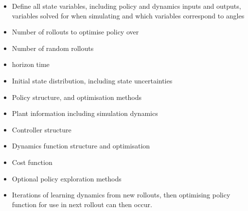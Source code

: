 \documentclass[twoside,twocolumn,12pt]{article}
\begin{document}
\begin{itemize}
\item Define all state variables, including policy and dynamics inputs and outputs, variables solved for when simulating and which variables correspond to angles
\item Number of rollouts to optimise policy over 
\item Number of random rollouts
\item horizon time
\item Initial state distribution, including state uncertainties
\item Policy structure, and optimisation methods
\item Plant information including simulation dynamics
\item Controller structure
\item Dynamics function structure and optimisation
\item Cost function
\item Optional policy exploration methods
\item Iterations of learning dynamics from new rollouts, then optimising policy function for use in next rollout can then occur.
\end{itemize}
\end{document}
